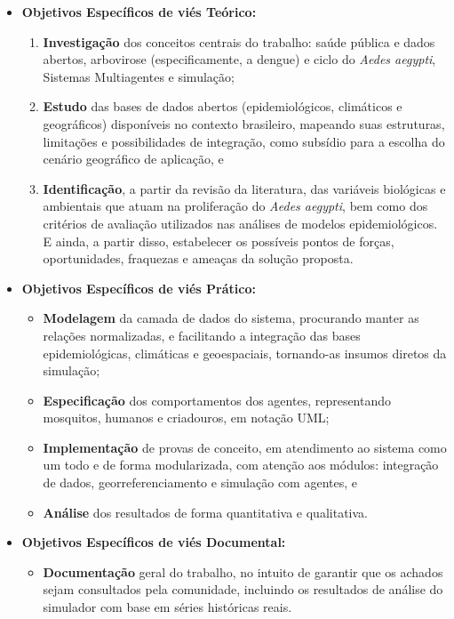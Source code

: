 \begin{itemize}
    \item \textbf{Objetivos Específicos de viés Teórico:}
    \begin{enumerate}
        \item \textbf{Investigação} dos conceitos centrais do trabalho: saúde pública e dados abertos, 
arbovirose (especificamente, a dengue) e ciclo do \textit{Aedes aegypti}, Sistemas Multiagentes e simulação;
        \item \textbf{Estudo} das bases de dados abertos (epidemiológicos, climáticos e
geográficos) disponíveis no contexto brasileiro, mapeando suas estruturas, limitações
e possibilidades de integração, como subsídio para a escolha do cenário
geográfico de aplicação, e
        \item \textbf{Identificação}, a partir da revisão da literatura, das variáveis biológicas e ambientais
que atuam na proliferação do \textit{Aedes aegypti}, bem como dos critérios de avaliação utilizados nas
análises de modelos epidemiológicos. E ainda, a partir disso, estabelecer os possíveis pontos de forças, oportunidades, fraquezas e ameaças da solução proposta.
    \end{enumerate}

    \item \textbf{Objetivos Específicos de viés Prático:}
    \begin{itemize}
        \item \textbf{Modelagem} da camada de dados do sistema, procurando manter as relações normalizadas, e facilitando a integração das bases epidemiológicas, climáticas e geoespaciais,
tornando-as insumos diretos da simulação;
        \item \textbf{Especificação} dos comportamentos dos agentes, representando mosquitos, humanos e criadouros, em notação UML;
        \item \textbf{Implementação} de provas de conceito, em atendimento ao sistema como um todo e de forma modularizada, com atenção aos módulos: integração de dados, georreferenciamento e simulação com agentes, e
        \item \textbf{Análise} dos resultados de forma quantitativa e qualitativa.
    \end{itemize}

    \item \textbf{Objetivos Específicos de viés Documental:}
    \begin{itemize}
        \item \textbf{Documentação} geral do trabalho, no intuito de garantir que os achados sejam consultados pela comunidade, incluindo os resultados de análise do simulador com base em séries históricas reais.
    \end{itemize}
\end{itemize}

